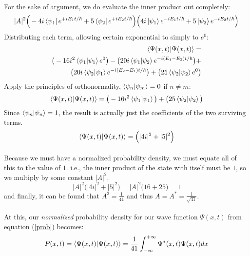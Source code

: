 \documentclass[12pt,letterpaper]{book}
\begin{document}
\paragraph*{}For the sake of argument, we do evaluate the inner product out completely:
\begin{equation}
|A|^2
\Big( - 4i \bra{\psi_1}e^{+iE_1t/\hbar} + 5 \bra{\psi_2} e^{+iE_2t/\hbar} \Big)
\Big( 4i \ket{\psi_1}e^{-iE_1t/\hbar} + 5 \ket{\psi_2} e^{-iE_2t/\hbar} \Big)
\end{equation}
Distributing each term, allowing certain exponential to simply to $e^0$:
\begin{equation}
\begin{split}
\braket{\Psi(x,t)}{\Psi(x,t)} = & \\
\big( -16i^2 \braket{\psi_1}{\psi_1} e^0 \big) - \big( 20i \braket{\psi_1}{\psi_2}e^{-i(E_1 - E_2)t/\hbar} \big) + & \\
\big(20i   \braket{\psi_2}{\psi_1} e^{-i(E_2 - E_1)t/\hbar} \big) +  \big( 25\braket{\psi_2}{\psi_2} e^0 \big)
\end{split}
\end{equation}
Apply the principles of orthonormality, $\braket{\psi_n}{\psi_m} = 0$ if $n \neq m$:
\begin{equation}
\braket{\Psi(x,t)}{\Psi(x,t)} = \big( -16i^2 \braket{\psi_1}{\psi_1} \big) + \big( 25\braket{\psi_2}{\psi_2} \big)
\end{equation}
Since $\braket{\psi_n}{\psi_n} =1 $, the result is actually just the coefficients of the two surviving terms.
\begin{equation}
\braket{\Psi(x,t)}{\Psi(x,t)}  = \Big(|4i|^2 + |5|^2 \Big)
\end{equation}

\paragraph*{}Because we must have a normalized probability density, we must equate all of this to the value of $1$. i.e., the inner product of the state with itself must be $1$, so we multiply by some constant $|A|^2$.
\begin{equation}
|A|^2 \Big(|4i|^2 + |5|^2 \Big) = |A|^2 \Big(16 + 25 \Big) = 1
\end{equation}
and finally, it can be found that $A^2 = \frac{1}{41}$ and thus $A = A^* = \frac{1}{\sqrt{41}}$.

\paragraph*{}At this, our \textit{normalized} probability density for our wave function $\Psi(x,t)$ from equation (\ref{prob}) becomes:
\begin{equation}
P(x,t) = \braket{\Psi(x,t)}{\Psi(x,t)} = \frac{1}{41}\int_{-\infty}^{+\infty} \Psi^*(x,t)\Psi(x,t) dx
\end{equation}
\end{document}
